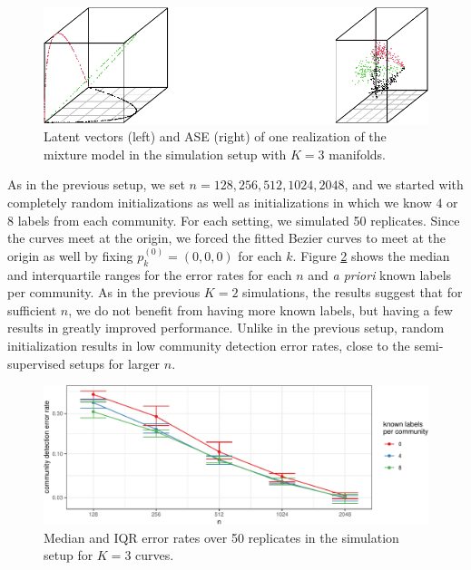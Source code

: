 \documentclass[
  12pt,
]{article}
\theoremstyle{definition}
\theoremstyle{definition}
\theoremstyle{definition}
\theoremstyle{definition}
\theoremstyle{remark}
\begin{document}
\begin{figure}[H]

{\centering \includegraphics{draft_files/figure-latex/three-curves-1} 

}

\caption{Latent vectors (left) and ASE (right) of one realization of the mixture model in the simulation setup with $K=3$ manifolds.}\label{fig:three-curves}
\end{figure}

As in the previous setup, we set \(n = 128, 256, 512, 1024, 2048\), and we started with completely random initializations as well as initializations in which we know \(4\) or \(8\) labels from each community.
For each setting, we simulated 50 replicates.
Since the curves meet at the origin, we forced the fitted Bezier curves to meet at the origin as well by fixing \(p_k^{(0)} = (0, 0, 0)\) for each \(k\).
Figure \ref{fig:sim-curves-3} shows the median and interquartile ranges for the error rates for each \(n\) and \emph{a priori} known labels per community.
As in the previous \(K = 2\) simulations, the results suggest that for sufficient \(n\), we do not benefit from having more known labels, but having a few results in greatly improved performance. Unlike in the previous setup, random initialization results in low community detection error rates, close to the semi-supervised setups for larger \(n\).

\begin{figure}[H]

{\centering \includegraphics{draft_files/figure-latex/sim-curves-3-1} 

}

\caption{Median and IQR error rates over 50 replicates in the simulation setup for $K = 3$ curves.}\label{fig:sim-curves-3}
\end{figure}
\end{document}
